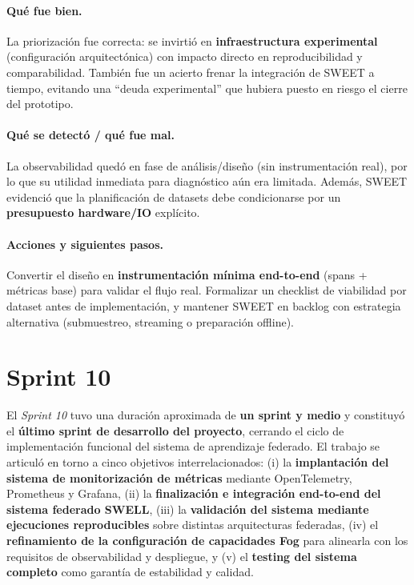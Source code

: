 \documentclass{report}
\begin{document}
\vspace{0.15em}
\paragraph{Qué fue bien.}
La priorización fue correcta: se invirtió en \textbf{infraestructura experimental} (configuración arquitectónica) con impacto directo en reproducibilidad y comparabilidad. También fue un acierto frenar la integración de SWEET a tiempo, evitando una “deuda experimental” que hubiera puesto en riesgo el cierre del prototipo.

\vspace{0.15em}
\paragraph{Qué se detectó / qué fue mal.}
La observabilidad quedó en fase de análisis/diseño (sin instrumentación real), por lo que su utilidad inmediata para diagnóstico aún era limitada. Además, SWEET evidenció que la planificación de datasets debe condicionarse por un \textbf{presupuesto hardware/IO} explícito.

\vspace{0.15em}
\paragraph{Acciones y siguientes pasos.}
Convertir el diseño en \textbf{instrumentación mínima end-to-end} (spans + métricas base) para validar el flujo real. Formalizar un checklist de viabilidad por dataset antes de implementación, y mantener SWEET en backlog con estrategia alternativa (submuestreo, streaming o preparación offline).




\section{Sprint 10}
\label{sect:Sp10}

El \textit{Sprint 10} tuvo una duración aproximada de \textbf{un sprint y medio} y constituyó el \textbf{último sprint de desarrollo del proyecto}, cerrando el ciclo de implementación funcional del sistema de aprendizaje federado. El trabajo se articuló en torno a cinco objetivos interrelacionados: (i) la \textbf{implantación del sistema de monitorización de métricas} mediante OpenTelemetry, Prometheus y Grafana, (ii) la \textbf{finalización e integración end-to-end del sistema federado SWELL}, (iii) la \textbf{validación del sistema mediante ejecuciones reproducibles} sobre distintas arquitecturas federadas, (iv) el \textbf{refinamiento de la configuración de capacidades Fog} para alinearla con los requisitos de observabilidad y despliegue, y (v) el \textbf{testing del sistema completo} como garantía de estabilidad y calidad.
\end{document}
